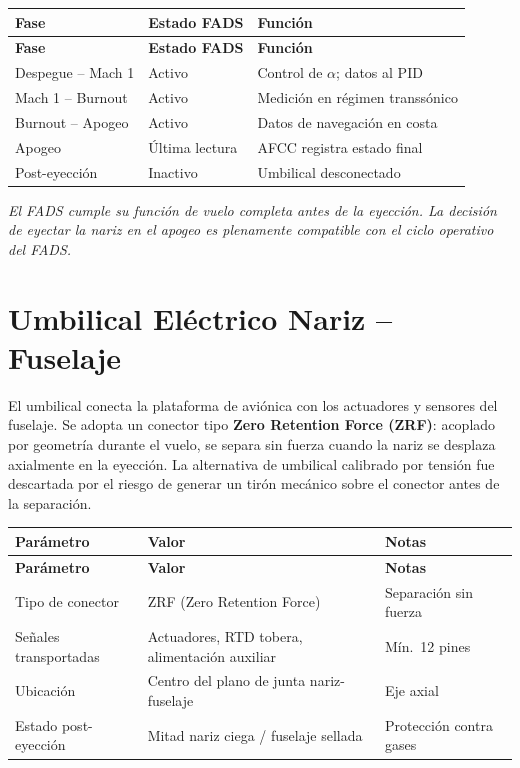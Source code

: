 \documentclass[11pt, a4paper]{article}
\begin{document}
\begin{longtable}{L{3cm} C{2.5cm} L{8cm}}
  \color{white}\textbf{Fase}&\color{white}\textbf{Estado FADS}&\color{white}\textbf{Funci\'{o}n}\\
  \endfirsthead
  \color{white}\textbf{Fase}&\color{white}\textbf{Estado FADS}&\color{white}\textbf{Funci\'{o}n}\\
  \endhead
  Despegue -- Mach 1 & Activo & Control de $\alpha$; datos al PID \\
  Mach 1 -- Burnout  & Activo & Medici\'{o}n en r\'{e}gimen transs\'{o}nico \\
  Burnout -- Apogeo  & Activo & Datos de navegaci\'{o}n en costa \\
  Apogeo             & \'{U}ltima lectura & AFCC registra estado final \\
  Post-eyecci\'{o}n  & Inactivo & Umbilical desconectado \\
\end{longtable}

\begin{mdframed}[linecolor=tlvgreen,linewidth=0.8pt,backgroundcolor=tlvgray]
  \small\textit{El FADS cumple su funci\'{o}n de vuelo completa antes de la eyecci\'{o}n. La decisi\'{o}n de eyectar la nariz en el apogeo es plenamente compatible con el ciclo operativo del FADS.}
\end{mdframed}

\section{Umbilical El\'{e}ctrico Nariz -- Fuselaje}

El umbilical conecta la plataforma de avi\'{o}nica con los actuadores y sensores del fuselaje. Se adopta un conector tipo \textbf{Zero Retention Force (ZRF)}: acoplado por geometr\'{i}a durante el vuelo, se separa sin fuerza cuando la nariz se desplaza axialmente en la eyecci\'{o}n. La alternativa de umbilical calibrado por tensi\'{o}n fue descartada por el riesgo de generar un tir\'{o}n mec\'{a}nico sobre el conector antes de la separaci\'{o}n.

\begin{longtable}{L{5cm} C{3cm} L{5.5cm}}
  \color{white}\textbf{Par\'{a}metro}&\color{white}\textbf{Valor}&\color{white}\textbf{Notas}\\
  \endfirsthead
  \color{white}\textbf{Par\'{a}metro}&\color{white}\textbf{Valor}&\color{white}\textbf{Notas}\\
  \endhead
  Tipo de conector          & ZRF (Zero Retention Force) & Separaci\'{o}n sin fuerza \\
  Se\~{n}ales transportadas & Actuadores, RTD tobera, alimentaci\'{o}n auxiliar & M\'{i}n.\ 12 pines \\
  Ubicaci\'{o}n             & Centro del plano de junta nariz-fuselaje & Eje axial \\
  Estado post-eyecci\'{o}n  & Mitad nariz ciega / fuselaje sellada & Protecci\'{o}n contra gases \\
\end{longtable}
\end{document}
